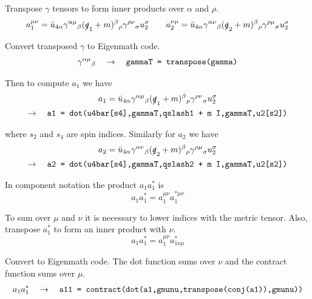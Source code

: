 \documentclass[12pt]{article}
\begin{document}
\noindent
Transpose $\gamma$ tensors to form inner products over $\alpha$ and $\rho$.
\begin{equation*}
a_1^{\mu\nu}
=\bar{u}_{4\alpha}\gamma^{\alpha\mu}{}_\beta(\slashed{q}_1+m)^\beta{}_\rho\gamma^{\rho\nu}{}_\sigma u_2^\sigma
\qquad
a_2^{\nu\mu}
=\bar{u}_{4\alpha}\gamma^{\alpha\nu}{}_\beta(\slashed{q}_2+m)^\beta{}_\rho\gamma^{\rho\mu}{}_\sigma u_2^\sigma
\end{equation*}

\noindent
Convert transposed $\gamma$ to Eigenmath code.
\begin{equation*}
\gamma^{\alpha\mu}{}_\beta
\quad\rightarrow\quad
\text{\tt gammaT = transpose(gamma)}
\end{equation*}

\noindent
Then to compute $a_1$ we have
\begin{multline*}
a_1=\bar{u}_{4\alpha}\gamma^{\alpha\mu}{}_\beta(\slashed{q}_1+m)^\beta{}_\rho\gamma^{\rho\nu}{}_\sigma u_2^\sigma
\\
\rightarrow\quad
\text{\tt a1 = dot(u4bar[s4],gammaT,qslash1 + m I,gammaT,u2[s2])}
\end{multline*}

\noindent
where $s_2$ and $s_4$ are spin indices.
Similarly for $a_2$ we have
\begin{multline*}
a_2=\bar{u}_{4\alpha}\gamma^{\alpha\nu}{}_\beta(\slashed{q}_2+m)^\beta{}_\rho\gamma^{\rho\mu}{}_\sigma u_2^\sigma
\\
\rightarrow\quad
\text{\tt a2 = dot(u4bar[s4],gammaT,qslash2 + m I,gammaT,u2[s2])}
\end{multline*}

\noindent
In component notation the product $a_1a_1^*$ is
\begin{equation*}
a_1a_1^*=a_1^{\mu\nu}a_1^{*\mu\nu}
\end{equation*}

\noindent
To sum over $\mu$ and $\nu$ it is necessary to lower indices with the metric tensor.
Also, transpose $a_1^*$ to form an inner product with $\nu$.
\begin{equation*}
a_1a_1^*=a_1^{\mu\nu}a_{1\nu\mu}^*
\end{equation*}

\noindent
Convert to Eigenmath code.
The dot function sums over $\nu$ and the contract function sums over $\mu$.
\begin{equation*}
a_1a_1^*
\quad\rightarrow\quad
\text{\tt a11 = contract(dot(a1,gmunu,transpose(conj(a1)),gmunu))}
\end{equation*}
\end{document}
